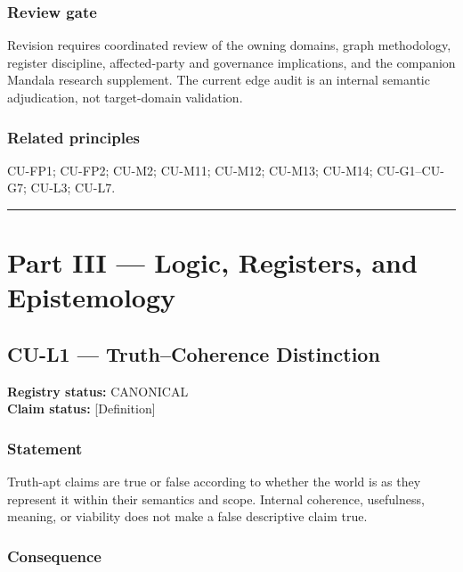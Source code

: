 \documentclass[
  11pt,
]{article}
\begin{document}
\subsubsection{Review gate}\label{review-gate-6}

Revision requires coordinated review of the owning domains, graph
methodology, register discipline, affected-party and governance
implications, and the companion Mandala research supplement. The current
edge audit is an internal semantic adjudication, not target-domain
validation.

\subsubsection{Related principles}\label{related-principles-6}

CU-FP1; CU-FP2; CU-M2; CU-M11; CU-M12; CU-M13; CU-M14; CU-G1--CU-G7;
CU-L3; CU-L7.

\begin{center}\rule{0.5\linewidth}{0.5pt}\end{center}

\section{Part III --- Logic, Registers, and
Epistemology}\label{part-iii-logic-registers-and-epistemology}

\subsection{CU-L1 --- Truth--Coherence
Distinction}\label{cu-l1-truthcoherence-distinction}

\textbf{Registry status:} CANONICAL\\
\textbf{Claim status:} {[}Definition{]}

\subsubsection{Statement}\label{statement-24}

Truth-apt claims are true or false according to whether the world is as
they represent it within their semantics and scope. Internal coherence,
usefulness, meaning, or viability does not make a false descriptive
claim true.

\subsubsection{Consequence}\label{consequence}
\end{document}
